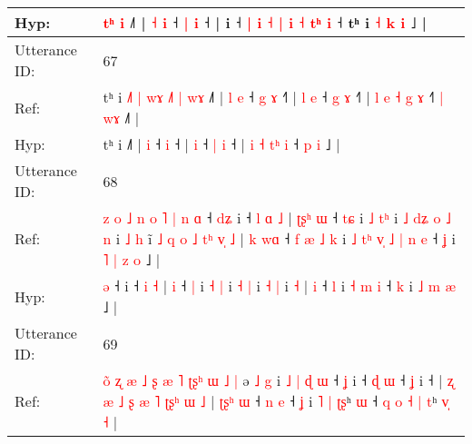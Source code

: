 \documentclass[10pt]{article}
\DeclareRobustCommand{\hl}[1]{{\textcolor{red}{#1}}}
\begin{document}
\begin{longtable}{ll}
 \\
Hyp: & \hl{t}\hl{ʰ}\hl{ }\hl{i} ˩˥ | \hl{}\hl{}\hl{˧} \hl{i} ˧ \hl{|} \hl{i} ˧ |\hl{}\hl{}\hl{} i ˧ \hl{|} \hl{i} \hl{˧} \hl{|} \hl{}\hl{i} \hl{˧} \hl{t}\hl{ʰ} \hl{i} ˧ t\hl{}ʰ i \hl{˧} \hl{}\hl{k} \hl{i} ˩ |
 \\
\midrule
Utterance ID: & 67 \\
Ref: & tʰ i\hl{ }\hl{˩}\hl{˥}\hl{ }\hl{|}\hl{ }\hl{w}\hl{ɤ}\hl{ }\hl{˩}\hl{˥}\hl{ }\hl{|}\hl{ }\hl{w}\hl{ɤ} ˩˥ |\hl{ }\hl{l} \hl{e} ˧\hl{ }\hl{g} \hl{ɤ} ˧\hl{˥} |\hl{ }\hl{l} \hl{e} ˧ \hl{g} \hl{ɤ} ˧\hl{˥} | \hl{l} \hl{e} \hl{˧}\hl{ }\hl{g} \hl{ɤ} ˧\hl{˥} \hl{|} \hl{w}\hl{ɤ} ˩\hl{˥} |
 \\
Hyp: & tʰ i\hl{}\hl{}\hl{}\hl{}\hl{}\hl{}\hl{}\hl{}\hl{}\hl{}\hl{}\hl{}\hl{}\hl{}\hl{}\hl{} ˩˥ |\hl{}\hl{} \hl{i} ˧\hl{}\hl{} \hl{i} ˧\hl{} |\hl{}\hl{} \hl{i} ˧ \hl{|} \hl{i} ˧\hl{} | \hl{i} \hl{˧} \hl{}\hl{t}\hl{ʰ} \hl{i} ˧\hl{} \hl{p} \hl{}\hl{i} ˩\hl{} |
 \\
\midrule
Utterance ID: & 68 \\
Ref: & \hl{z}\hl{ }\hl{o}\hl{ }\hl{˩}\hl{ }\hl{n}\hl{ }\hl{o}\hl{ }\hl{˥}\hl{ }\hl{|}\hl{ }\hl{n}\hl{ }\hl{ɑ} ˧\hl{ }\hl{d}\hl{ʑ} i ˧\hl{ }\hl{l} \hl{ɑ} \hl{˩} |\hl{ }\hl{ʈ}\hl{ʂ}\hl{ʰ} \hl{ɯ} ˧ \hl{t}\hl{ɕ} i \hl{˩} \hl{t}\hl{ʰ} i\hl{ }\hl{˩}\hl{ }\hl{d}\hl{ʑ}\hl{ }\hl{o} \hl{˩} \hl{n} i \hl{˩} \hl{h} i\hl{̃}\hl{ }\hl{˩}\hl{ }\hl{q}\hl{ }\hl{o}\hl{ }\hl{˩}\hl{ }\hl{t}\hl{ʰ}\hl{ }\hl{v}\hl{̩} \hl{˩} |\hl{ }\hl{k} \hl{w}\hl{ɑ} ˧\hl{ }\hl{f}\hl{ }\hl{æ}\hl{ }\hl{˩} \hl{k} i\hl{ }\hl{˩}\hl{ }\hl{t}\hl{ʰ}\hl{ }\hl{v}\hl{̩}\hl{ }\hl{˩} \hl{|} \hl{n} \hl{e} ˧ \hl{ʝ} i\hl{ }\hl{˥} \hl{|} \hl{z} \hl{o} ˩ |
 \\
Hyp: & \hl{}\hl{}\hl{}\hl{}\hl{}\hl{}\hl{}\hl{}\hl{}\hl{}\hl{}\hl{}\hl{}\hl{}\hl{}\hl{}\hl{ə} ˧\hl{}\hl{}\hl{} i ˧\hl{}\hl{} \hl{i} \hl{˧} |\hl{}\hl{}\hl{}\hl{} \hl{i} ˧ \hl{}\hl{|} i \hl{˧} \hl{}\hl{|} i\hl{}\hl{}\hl{}\hl{}\hl{}\hl{}\hl{} \hl{˧} \hl{|} i \hl{˧} \hl{|} i\hl{}\hl{}\hl{}\hl{}\hl{}\hl{}\hl{}\hl{}\hl{}\hl{}\hl{}\hl{}\hl{}\hl{}\hl{} \hl{˧} |\hl{}\hl{} \hl{}\hl{i} ˧\hl{}\hl{}\hl{}\hl{}\hl{}\hl{} \hl{l} i\hl{}\hl{}\hl{}\hl{}\hl{}\hl{}\hl{}\hl{}\hl{}\hl{} \hl{˧} \hl{m} \hl{i} ˧ \hl{k} i\hl{}\hl{} \hl{˩} \hl{m} \hl{æ} ˩ |
 \\
\midrule
Utterance ID: & 69 \\
Ref: & \hl{o}\hl{̃}\hl{ }\hl{ʐ}\hl{ }\hl{æ}\hl{ }\hl{˩}\hl{ }\hl{ʂ}\hl{ }\hl{æ}\hl{ }\hl{˥}\hl{ }\hl{ʈ}\hl{ʂ}\hl{ʰ}\hl{ }\hl{ɯ}\hl{ }\hl{˩}\hl{ }\hl{|}\hl{ }ə\hl{ }\hl{˩} \hl{g} i\hl{ }\hl{˩}\hl{ }\hl{|}\hl{ }\hl{ɖ}\hl{ }\hl{ɯ} ˧\hl{ }\hl{ʝ} i ˧ \hl{ɖ} \hl{ɯ} ˧ \hl{ʝ} i ˧ |\hl{ }\hl{ʐ} \hl{æ} \hl{˩} \hl{ʂ} \hl{æ} \hl{˥} \hl{ʈ}\hl{ʂ}\hl{ʰ} \hl{ɯ} \hl{˩} |\hl{ }\hl{ʈ}\hl{ʂ}\hl{ʰ} \hl{ɯ} ˧ \hl{n} \hl{e} ˧ \hl{ʝ} i\hl{ }\hl{˥} \hl{|} \hl{ʈ}\hl{ʂ}ʰ \hl{ɯ} ˧ \hl{q}\hl{ }\hl{o} \hl{˧} \hl{|} \hl{t}ʰ \hl{v}\hl{̩} \hl{˧} |

\end{longtable}
\end{document}
